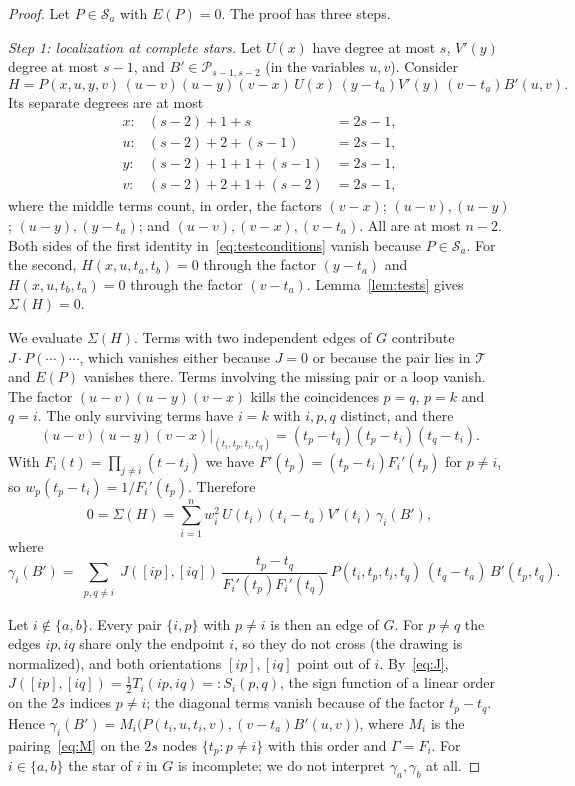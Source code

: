 \documentclass[11pt,a4paper]{article}
\theoremstyle{definition}
\theoremstyle{remark}
\numberwithin{equation}{section}
\newcommand{\PP}{\mathcal P}
\newcommand{\SSS}{\mathcal S}
\newcommand{\TT}{\mathcal T}
\begin{document}
\begin{proof}
Let $P\in\SSS_a$ with $E(P)=0$. The proof has three steps.

\emph{Step 1: localization at complete stars.} Let $U(x)$ have degree at most $s$, $V'(y)$ degree at most $s-1$, and $B'\in\PP_{s-1,s-2}$ (in the variables $u,v$). Consider
\begin{equation}\label{eq:loctest}
H=P(x,u,y,v)\,(u-v)(u-y)(v-x)\,U(x)\,(y-t_a)V'(y)\,(v-t_a)B'(u,v).
\end{equation}
Its separate degrees are at most
\[
\begin{array}{lll}
x:&(s-2)+1+s&=2s-1,\\
u:&(s-2)+2+(s-1)&=2s-1,\\
y:&(s-2)+1+1+(s-1)&=2s-1,\\
v:&(s-2)+2+1+(s-2)&=2s-1,
\end{array}
\]
where the middle terms count, in order, the factors $(v-x)$; $(u-v),(u-y)$; $(u-y),(y-t_a)$; and $(u-v),(v-x),(v-t_a)$. All are at most $n-2$. Both sides of the first identity in~\eqref{eq:testconditions} vanish because $P\in\SSS_a$. For the second, $H(x,u,t_a,t_b)=0$ through the factor $(y-t_a)$ and $H(x,u,t_b,t_a)=0$ through the factor $(v-t_a)$. Lemma~\ref{lem:tests} gives $\Sigma(H)=0$.

We evaluate $\Sigma(H)$. Terms with two independent edges of $G$ contribute $J\cdot P(\cdots)\cdots$, which vanishes either because $J=0$ or because the pair lies in $\TT$ and $E(P)$ vanishes there. Terms involving the missing pair or a loop vanish. The factor $(u-v)(u-y)(v-x)$ kills the coincidences $p=q$, $p=k$ and $q=i$. The only surviving terms have $i=k$ with $i,p,q$ distinct, and there
\[
(u-v)(u-y)(v-x)\big|_{(t_i,t_p,t_i,t_q)}=(t_p-t_q)(t_p-t_i)(t_q-t_i).
\]
With $F_i(t)=\prod_{j\ne i}(t-t_j)$ we have $F'(t_p)=(t_p-t_i)F_i'(t_p)$ for $p\ne i$, so $w_p(t_p-t_i)=1/F_i'(t_p)$. Therefore
\begin{equation}\label{eq:localized}
0=\Sigma(H)=\sum_{i=1}^nw_i^2\,U(t_i)(t_i-t_a)V'(t_i)\,\gamma_i(B'),
\end{equation}
where
\[
\gamma_i(B')=\sum_{\substack{p,q\ne i}}J([ip],[iq])\,\frac{t_p-t_q}{F_i'(t_p)F_i'(t_q)}\,P(t_i,t_p,t_i,t_q)\,(t_q-t_a)\,B'(t_p,t_q).
\]

Let $i\notin\{a,b\}$. Every pair $\{i,p\}$ with $p\ne i$ is then an edge of $G$. For $p\ne q$ the edges $ip,iq$ share only the endpoint $i$, so they do not cross (the drawing is normalized), and both orientations $[ip],[iq]$ point out of $i$. By~\eqref{eq:J}, $J([ip],[iq])=\frac12T_i(ip,iq)=:S_i(p,q)$, the sign function of a linear order on the $2s$ indices $p\ne i$; the diagonal terms vanish because of the factor $t_p-t_q$. Hence $\gamma_i(B')=M_i\bigl(P(t_i,u,t_i,v),(v-t_a)B'(u,v)\bigr)$, where $M_i$ is the pairing~\eqref{eq:M} on the $2s$ nodes $\{t_p:p\ne i\}$ with this order and $\Gamma=F_i$. For $i\in\{a,b\}$ the star of $i$ in $G$ is incomplete; we do not interpret $\gamma_a,\gamma_b$ at all.


\end{proof}
\end{document}
